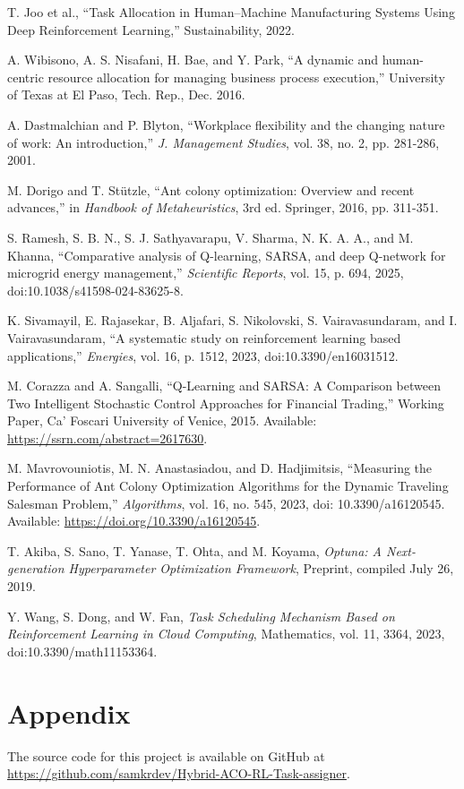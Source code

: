 \documentclass[%
aip,
cp,  %
amsmath,amssymb,
reprint,%
]{revtex4-2}
\begin{document}
\begin{thebibliography}{99}
		 T. Joo et al., ``Task Allocation in Human–Machine Manufacturing
		Systems Using Deep Reinforcement Learning,'' Sustainability, 2022.
		
		 A. Wibisono, A. S. Nisafani, H. Bae, and Y. Park, ``A dynamic
		and human-centric resource allocation for managing business process execution,''
		University of Texas at El Paso, Tech. Rep., Dec. 2016.
		
		 A. Dastmalchian and P. Blyton, ``Workplace flexibility
		and the changing nature of work: An introduction,'' \textit{J. Management Studies},
		vol. 38, no. 2, pp. 281-286, 2001.
		
		 M. Dorigo and T. Stützle, ``Ant colony optimization:
		Overview and recent advances,'' in \textit{Handbook of Metaheuristics}, 3rd
		ed. Springer, 2016, pp. 311-351.
		
		 S. Ramesh, S. B. N., S. J. Sathyavarapu, V. Sharma, N. K. A. A., and M. Khanna, ``Comparative analysis of Q-learning, SARSA, and deep Q-network for microgrid energy management,'' \textit{Scientific Reports}, vol. 15, p. 694, 2025, doi:10.1038/s41598-024-83625-8.
		
		 K. Sivamayil, E. Rajasekar, B. Aljafari, S. Nikolovski, S. Vairavasundaram, and I. Vairavasundaram, ``A systematic study on reinforcement learning based applications,'' \textit{Energies}, vol. 16, p. 1512, 2023, doi:10.3390/en16031512.
		
		M. Corazza and A. Sangalli, ``Q-Learning and SARSA: A Comparison between Two Intelligent Stochastic Control Approaches for Financial Trading,'' Working Paper, Ca’ Foscari University of Venice, 2015. Available: \url{https://ssrn.com/abstract=2617630}.
		
		M. Mavrovouniotis, M. N. Anastasiadou, and D. Hadjimitsis, ``Measuring the Performance of Ant Colony Optimization Algorithms for the Dynamic Traveling Salesman Problem,'' \textit{Algorithms}, vol. 16, no. 545, 2023, doi: 10.3390/a16120545. Available: \url{https://doi.org/10.3390/a16120545}.
		
		T. Akiba, S. Sano, T. Yanase, T. Ohta, and M. Koyama, \emph{Optuna: A Next-generation Hyperparameter Optimization Framework}, Preprint, compiled July 26, 2019.
		
		
		Y. Wang, S. Dong, and W. Fan, \emph{Task Scheduling Mechanism Based on Reinforcement Learning in Cloud Computing}, Mathematics, vol. 11, 3364, 2023, doi:10.3390/math11153364.
		
	\end{thebibliography}
	
	\section{\label{sec:appendix}Appendix}
	The source code for this project is available on GitHub at \url{https://github.com/samkrdev/Hybrid-ACO-RL-Task-assigner}.
	
	
	
\end{document}
